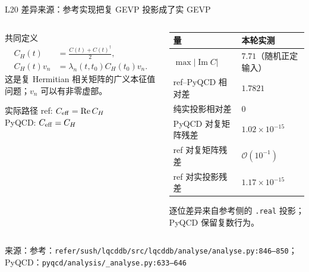 \documentclass[UTF8,aspectratio=169,11pt]{ctexbeamer}
\newcommand{\source}[1]{\vspace{0.05em}\par{\raggedright\scriptsize\color{muted}来源：#1\par}}
\begin{document}
\begin{frame}[t]{L20 差异来源：参考实现把复 GEVP 投影成了实 GEVP}
  \footnotesize
  \begin{columns}[T,totalwidth=\textwidth]
    \begin{column}{0.47\textwidth}
      \begin{block}{共同定义}
        \begin{align*}
          C_H(t)&=\frac{C(t)+C(t)^\dagger}{2},\\
          C_H(t)v_n&=\lambda_n(t,t_0)C_H(t_0)v_n.
        \end{align*}
        这是复 Hermitian 相关矩阵的广义本征值问题；$v_n$ 可以有非零虚部。
      \end{block}
      \begin{block}{实际路径}
        \textcolor{warning}{ref:} $C_{\rm eff}=\operatorname{Re} C_H$\\
        \textcolor{evidence}{PyQCD:} $C_{\rm eff}=C_H$
      \end{block}
    \end{column}
    \begin{column}{0.49\textwidth}
      \setlength{\tabcolsep}{2pt}
      \renewcommand{\arraystretch}{0.90}
      \begin{tabularx}{\linewidth}{@{}lY@{}}
        \toprule
        量 & 本轮实测\\
        \midrule
        $\max|\operatorname{Im} C|$ & $7.71$（随机正定输入）\\
        ref--PyQCD 相对差 & $1.7821$\\
        纯实投影相对差 & $0$\\
        PyQCD 对复矩阵残差 & $1.02\times10^{-15}$\\
        ref 对复矩阵残差 & $\mathcal O(10^{-1})$\\
        ref 对实投影残差 & $1.17\times10^{-15}$\\
        \bottomrule
      \end{tabularx}
      \colorbox{warnbg}{\parbox{0.96\linewidth}{\small
        逐位差异来自参考侧的 \texttt{.real} 投影；PyQCD 保留复数行为。}}
    \end{column}
  \end{columns}
  \source{参考：\texttt{refer/sush/lqcddb/src/lqcddb/analyse/analyse.py:846--850}；PyQCD：\texttt{pyqcd/analysis/\_analyse.py:633--646}}
\end{frame}
\end{document}
